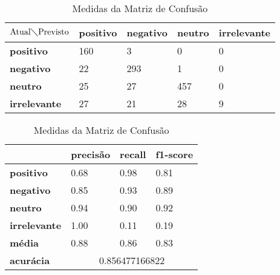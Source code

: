 \begin{table}[h!]
\centering
\begin{minipage}[b]{0.45\linewidth}
\caption{Matriz de Confusão Quaternário: \textit{Random Forest}}
\label{tab:mcb-nb}
\begin{tabular}{|l|l|l|l|l|}
\hline
$\textrm{Atual}\diagdown\textrm{Previsto}$ & \textbf{positivo} & \textbf{negativo} & \textbf{neutro} & \textbf{irrelevante}\\ \hline
\textbf{positivo} & 160 & 3 & 0 & 0\\ \hline
\textbf{negativo} & 22 & 293 & 1 & 0\\ \hline
\textbf{neutro} & 25 & 27 & 457 & 0\\ \hline
\textbf{irrelevante} & 27 & 21 & 28 & 9\\ \hline
\end{tabular}
\end{minipage}
\hspace{0.5cm}
\begin{minipage}[b]{0.45\linewidth}

\centering
\caption{Medidas da Matriz de Confusão}
\label{tab:mmcb-nb}
\begin{tabular}{|l|l|l|l|}
\hline
         & \textbf{precisão} & \textbf{recall} & \textbf{f1-score} \\ \hline
\textbf{positivo} & 0.68     & 0.98   & 0.81     \\ \hline
\textbf{negativo} & 0.85     & 0.93   & 0.89     \\ \hline
\textbf{neutro} & 0.94     & 0.90   & 0.92     \\ \hline
\textbf{irrelevante} & 1.00     & 0.11   & 0.19     \\ \hline
\textbf{média} & 0.88     & 0.86   & 0.83     \\ \hline
\textbf{acurácia} & \multicolumn{3}{|c|}{0.856477166822}\\ \hline
\end{tabular}
\end{minipage}
\end{table}